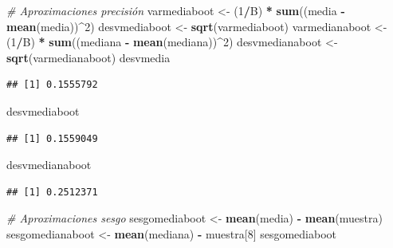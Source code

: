 \documentclass[]{book}
\newenvironment{Shaded}{\begin{snugshade}}{\end{snugshade}}
\newcommand{\KeywordTok}[1]{\textcolor[rgb]{0.13,0.29,0.53}{\textbf{#1}}}
\newcommand{\DecValTok}[1]{\textcolor[rgb]{0.00,0.00,0.81}{#1}}
\newcommand{\StringTok}[1]{\textcolor[rgb]{0.31,0.60,0.02}{#1}}
\newcommand{\CommentTok}[1]{\textcolor[rgb]{0.56,0.35,0.01}{\textit{#1}}}
\newcommand{\OperatorTok}[1]{\textcolor[rgb]{0.81,0.36,0.00}{\textbf{#1}}}
\newcommand{\NormalTok}[1]{#1}
\theoremstyle{definition}
\theoremstyle{definition}
\theoremstyle{definition}
\theoremstyle{remark}
\begin{document}
\begin{Shaded}
\begin{Highlighting}[]
\CommentTok{# Aproximaciones precisión}
\NormalTok{varmediaboot <-}\StringTok{ }\NormalTok{(}\DecValTok{1}\OperatorTok{/}\NormalTok{B) }\OperatorTok{*}\StringTok{ }\KeywordTok{sum}\NormalTok{((media }\OperatorTok{-}\StringTok{ }\KeywordTok{mean}\NormalTok{(media))}\OperatorTok{^}\DecValTok{2}\NormalTok{)}
\NormalTok{desvmediaboot <-}\StringTok{ }\KeywordTok{sqrt}\NormalTok{(varmediaboot)}
\NormalTok{varmedianaboot <-}\StringTok{ }\NormalTok{(}\DecValTok{1}\OperatorTok{/}\NormalTok{B) }\OperatorTok{*}\StringTok{ }\KeywordTok{sum}\NormalTok{((mediana }\OperatorTok{-}\StringTok{ }\KeywordTok{mean}\NormalTok{(mediana))}\OperatorTok{^}\DecValTok{2}\NormalTok{)}
\NormalTok{desvmedianaboot <-}\StringTok{ }\KeywordTok{sqrt}\NormalTok{(varmedianaboot)}
\NormalTok{desvmedia}
\end{Highlighting}
\end{Shaded}

\begin{verbatim}
## [1] 0.1555792
\end{verbatim}

\begin{Shaded}
\begin{Highlighting}[]
\NormalTok{desvmediaboot}
\end{Highlighting}
\end{Shaded}

\begin{verbatim}
## [1] 0.1559049
\end{verbatim}

\begin{Shaded}
\begin{Highlighting}[]
\NormalTok{desvmedianaboot}
\end{Highlighting}
\end{Shaded}

\begin{verbatim}
## [1] 0.2512371
\end{verbatim}

\begin{Shaded}
\begin{Highlighting}[]
\CommentTok{# Aproximaciones sesgo}
\NormalTok{sesgomediaboot <-}\StringTok{ }\KeywordTok{mean}\NormalTok{(media) }\OperatorTok{-}\StringTok{ }\KeywordTok{mean}\NormalTok{(muestra)}
\NormalTok{sesgomedianaboot <-}\StringTok{ }\KeywordTok{mean}\NormalTok{(mediana) }\OperatorTok{-}\StringTok{ }\NormalTok{muestra[}\DecValTok{8}\NormalTok{]}
\NormalTok{sesgomediaboot}
\end{Highlighting}
\end{Shaded}
\end{document}
